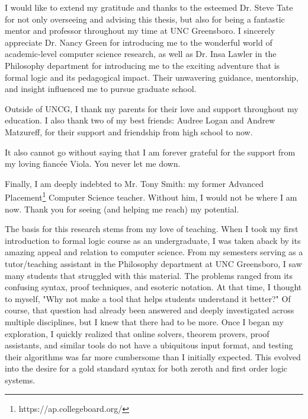 \documentclass[ms]{uncgdissertationexp2}
\theoremstyle{plain}
\theoremstyle{definition}
\theoremstyle{remark}
\begin{document}
\begin{acknowledgments}
I would like to extend my gratitude and thanks to the esteemed Dr. Steve Tate for not only overseeing and advising this thesis, but also for being a fantastic mentor and professor throughout my time at UNC Greensboro. I sincerely appreciate Dr. Nancy Green for introducing me to the wonderful world of academic-level computer science research, as well as Dr. Insa Lawler in the Philosophy department for introducing me to the exciting adventure that is formal logic and its pedagogical impact. Their unwavering guidance, mentorship, and insight influenced me to pursue graduate school.

Outside of UNCG, I thank my parents for their love and support throughout my education. I also thank two of my best friends: Audree Logan and Andrew Matzureff, for their support and friendship from high school to now.

It also cannot go without saying that I am forever grateful for the support from my loving fiancée Viola. You never let me down.

Finally, I am deeply indebted to Mr. Tony Smith: my former Advanced Placement\footnote{https://ap.collegeboard.org/} Computer Science teacher. Without him, I would not be where I am now. Thank you for seeing (and helping me reach) my potential.
\end{acknowledgments}

\begin{preface}
The basis for this research stems from my love of teaching. When I took my first introduction to formal logic course as an undergraduate, I was taken aback by its amazing appeal and relation to computer science. From my semesters serving as a tutor/teaching assistant in the Philosophy department at UNC Greensboro, I saw many students that struggled with this material. The problems ranged from its confusing syntax, proof techniques, and esoteric notation. At that time, I thought to myself, "Why not make a tool that helps students understand it better?" Of course, that question had already been answered and deeply investigated across multiple disciplines, but I knew that there had to be more. Once I began my exploration, I quickly realized that online solvers, theorem provers, proof assistants, and similar tools do not have a ubiquitous input format, and testing their algorithms was far more cumbersome than I initially expected. This evolved into the desire for a gold standard syntax for both zeroth and first order logic systems.
\end{preface}
\end{document}
